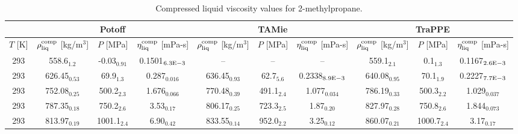 \documentclass[preprint,review,11pt]{elsarticle}
\begin{document}
\begin{landscape}

	\begin{table}[H]
		\caption{Compressed liquid viscosity values for 2-methylpropane.}
		\begin{center}
			\begin{tabular}{|c|c|c|c|c|c|c|c|c|c|}
				\hline
				& \multicolumn{3}{c|}{Potoff}                                                                          & \multicolumn{3}{c|}{TAMie}                                                                              & \multicolumn{3}{c|}{TraPPE}                                                                          \\ \hline
				$T$ {[}K{]} & $\rho^{\rm comp}_{\rm liq}$ {[}kg/m$^3${]} & $P$ {[}MPa{]}  & $\eta^{\rm comp}_{\rm liq}$ {[}mPa-s{]} & $\rho^{\rm comp}_{\rm liq}$ {[}kg/m$^3${]} & $P$ {[}MPa{]}     & $\eta^{\rm comp}_{\rm liq}$ {[}mPa-s{]} & $\rho^{\rm comp}_{\rm liq}$ {[}kg/m$^3${]} & $P$ {[}MPa{]}  & $\eta^{\rm comp}_{\rm liq}$ {[}mPa-s{]} \\ \hline
				293         & 558.6$_{1.2}$                              & -0.03$_{0.91}$ & 0.1501$_{6.3 \rm E-3}$                      & --                          & -- & --                     & 559.1$_{2.1}$                          & 0.1$_{1.3}$    & 0.1167$_{2.6 \rm E-3}$                      \\ \hline
				293         & 626.45$_{0.53}$                            & 69.9$_{1.3}$   & 0.287$_{0.016}$                        & 636.45$_{0.93}$                         & 62.7$_{5.6}$      & 0.2338$_{8.9 \rm E-3}$                      & 640.08$_{0.95}$                         & 70.1$_{1.9}$   & 0.2227$_{7.7 \rm E-3}$                      \\ \hline
				293         & 752.08$_{0.25}$                            & 500.2$_{2.3}$  & 1.676$_{0.066}$                        & 770.48$_{0.39}$                         & 491.1$_{2.4}$     & 1.077$_{0.034}$                        & 786.19$_{0.33}$                         & 500.3$_{2.2}$  & 1.029$_{0.037}$                        \\ \hline
				293         & 787.35$_{0.18}$                            & 750.2$_{2.6}$  & 3.53$_{0.17}$                          & 806.17$_{0.25}$                         & 723.3$_{2.5}$     & 1.87$_{0.20}$                          & 827.97$_{0.28}$                         & 750.8$_{2.6}$  & 1.844$_{0.073}$                        \\ \hline
				293         & 813.97$_{0.19}$                            & 1001.1$_{2.4}$ & 6.90$_{0.42}$                          & 833.55$_{0.14}$                         & 952.0$_{2.2}$     & 3.25$_{0.12}$                          & 860.07$_{0.21}$                         & 1000.7$_{2.4}$ & 3.17$_{0.17}$                          \\ \hline
			\end{tabular}
		\end{center}
	\end{table}


\end{landscape}
\end{document}
